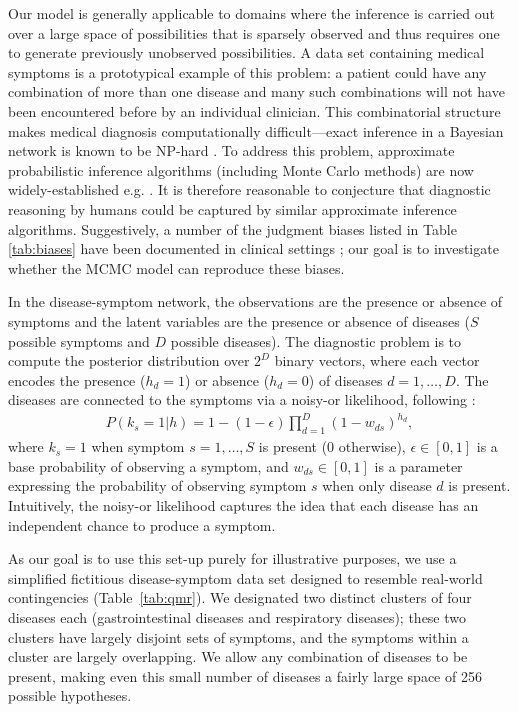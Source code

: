 Our model is generally applicable to domains where the inference is carried out over a large space of possibilities that is sparsely observed and thus requires one to generate previously unobserved possibilities. A data set containing medical symptoms is a prototypical example of this problem: a patient could have any combination of more than one disease and many such combinations will not have been encountered before by an individual clinician. This combinatorial structure makes medical diagnosis computationally difficult---exact inference in a Bayesian network is known to be NP-hard \citep{cooper1990complexity}. To address this problem, approximate probabilistic inference algorithms (including Monte Carlo methods) are now widely-established e.g. \citet{Shwe1991, Jaakkola1999, Heckerman1990}. It is therefore reasonable to conjecture that diagnostic reasoning by humans could be captured by similar approximate inference algorithms. Suggestively, a number of the judgment biases listed in Table \ref{tab:biases} have been documented in clinical settings \citep{redelmeier1995probability,elstein1978medical,weber1993}; our goal is to investigate whether the MCMC model can reproduce these biases.

In the disease-symptom network, the observations are the presence or absence of symptoms and the latent variables are the presence or absence of diseases ($S$ possible symptoms and $D$ possible diseases). The diagnostic problem is to compute the posterior distribution over $2^D$ binary vectors, where each vector encodes the presence ($h_d=1$) or absence ($h_d=0$) of diseases $d = 1,\ldots,D$. The diseases are connected to the symptoms via a noisy-or likelihood, following \citet{shwe1991probabilistic}:
\begin{align}
P(k_s = 1|h) = 1 - (1-\epsilon) \prod_{d=1}^D (1-w_{ds})^{h_d},
\end{align}
where $k_s = 1$ when symptom $s = 1, \ldots, S$ is present (0 otherwise), $\epsilon \in [0,1]$ is a base probability of observing a symptom, and $w_{ds} \in [0,1]$ is a parameter expressing the probability of observing symptom $s$ when only disease $d$ is present. Intuitively, the noisy-or likelihood captures the idea that each disease has an independent chance to produce a symptom.

As our goal is to use this set-up purely for illustrative purposes, we use a simplified fictitious disease-symptom data set designed to resemble real-world contingencies (Table~\ref{tab:qmr}). We designated two distinct clusters of four diseases each (gastrointestinal diseases and respiratory diseases); these two clusters have largely disjoint sets of symptoms, and the symptoms within a cluster are largely overlapping. We allow any combination of diseases to be present, making even this small number of diseases a fairly large space of 256 possible hypotheses.


